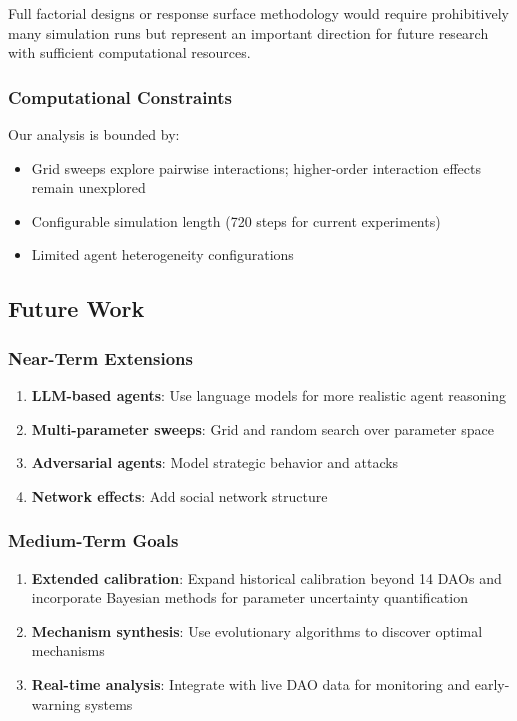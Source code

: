 Full factorial designs or response surface methodology would require prohibitively many simulation runs but represent an important direction for future research with sufficient computational resources.

\subsubsection{Computational Constraints}

Our analysis is bounded by:

\begin{itemize}
    \item Grid sweeps explore pairwise interactions; higher-order interaction effects remain unexplored
    \item Configurable simulation length (720 steps for current experiments)
    \item Limited agent heterogeneity configurations
\end{itemize}

\subsection{Future Work}

\subsubsection{Near-Term Extensions}

\begin{enumerate}
    \item \textbf{LLM-based agents}: Use language models for more realistic agent reasoning
    \item \textbf{Multi-parameter sweeps}: Grid and random search over parameter space
    \item \textbf{Adversarial agents}: Model strategic behavior and attacks
    \item \textbf{Network effects}: Add social network structure
\end{enumerate}

\subsubsection{Medium-Term Goals}

\begin{enumerate}
    \item \textbf{Extended calibration}: Expand historical calibration beyond 14 DAOs and incorporate Bayesian methods for parameter uncertainty quantification
    \item \textbf{Mechanism synthesis}: Use evolutionary algorithms to discover optimal mechanisms
    \item \textbf{Real-time analysis}: Integrate with live DAO data for monitoring and early-warning systems
\end{enumerate}

